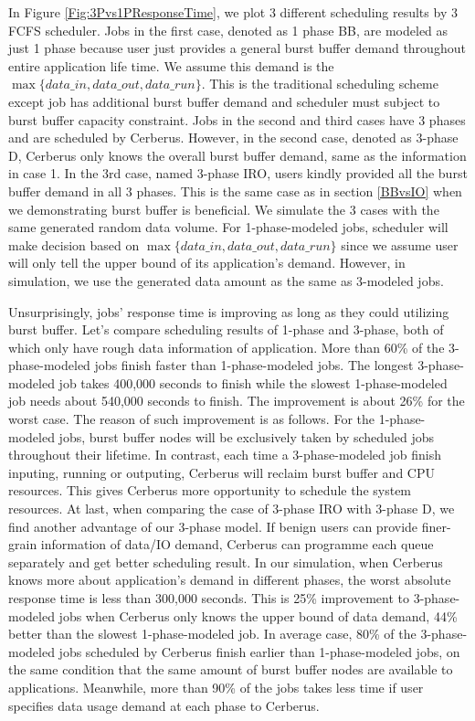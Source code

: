 In Figure \ref{Fig:3Pvs1PResponseTime}, we plot 3 different scheduling results by 3 FCFS scheduler.
Jobs in the first case, denoted as 1 phase BB, are modeled as just 1 phase because user just provides
a general burst buffer demand throughout entire application life time.
We assume this demand is the $\max \{data\_in, data\_out, data\_run\}$.
This is the traditional scheduling scheme except job has additional
burst buffer demand and scheduler must subject to burst buffer capacity constraint.
Jobs in the second and third cases have 3 phases and are scheduled by Cerberus.
However, in the second case, denoted as 3-phase D, Cerberus only knows the overall burst buffer demand,
same as the information in case 1.
In the 3rd case, named 3-phase IRO, users kindly provided all the burst buffer demand in all 3 phases.
This is the same case as in section \ref{BBvsIO} when we demonstrating burst buffer is beneficial.
We simulate the 3 cases with the same generated random data volume.
For 1-phase-modeled jobs, scheduler will make decision based on $\max \{data\_in, data\_out, data\_run\}$
since we assume user will only tell the upper bound of its application's demand.
However, in simulation, we use the generated data amount as the same as 3-modeled jobs.

Unsurprisingly, jobs' response time is improving as long as they could utilizing burst buffer.
Let's compare scheduling results of 1-phase and 3-phase, both of which only have rough data information of application.
More than 60\% of the 3-phase-modeled jobs finish faster than 1-phase-modeled jobs.
The longest 3-phase-modeled job takes 400,000 seconds to finish while the slowest 1-phase-modeled job
needs about 540,000 seconds to finish.
The improvement is about 26\% for the worst case.
The reason of such improvement is as follows.
For the 1-phase-modeled jobs, burst buffer nodes will be exclusively taken by scheduled jobs
throughout their lifetime.
In contrast, each time a 3-phase-modeled job finish inputing, running or outputing,
Cerberus will reclaim burst buffer and CPU resources.
This gives Cerberus more opportunity to schedule the system resources.
At last, when comparing the case of 3-phase IRO with 3-phase D, we find another advantage of our 3-phase model.
If benign users can provide finer-grain information of data/IO demand,
Cerberus can programme each queue separately and get better scheduling result.
In our simulation, when Cerberus knows more about application's demand in different phases,
the worst absolute response time is less than 300,000 seconds.
This is 25\% improvement to 3-phase-modeled jobs when Cerberus only knows the upper bound of data demand,
44\% better than the slowest 1-phase-modeled job.
In average case, 80\% of the 3-phase-modeled jobs scheduled by Cerberus finish earlier than 1-phase-modeled jobs,
on the same condition that the same amount of burst buffer nodes are available to applications.
Meanwhile, more than 90\% of the jobs takes less time if user specifies data usage demand
at each phase to Cerberus.

